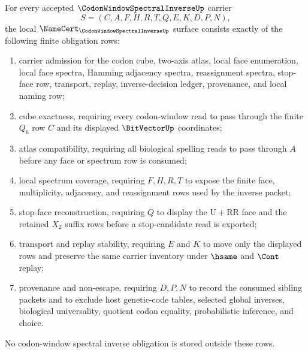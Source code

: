 
\begin{theorem}
\label{thm:codon-window-spectral-inverse-namecert-obligations}
For every accepted $\CodonWindowSpectralInverseUp$ carrier
$$
S=(C,A,F,H,R,T,Q,E,K,D,P,N),
$$
the local $\NameCert_{\CodonWindowSpectralInverseUp}$ surface consists exactly of the following finite obligation rows:
\begin{enumerate}
\item carrier admission for the codon cube, two-axis atlas, local face enumeration, local face spectra, Hamming adjacency spectra, reassignment spectra, stop-face row, transport, replay, inverse-decision ledger, provenance, and local naming row;
\item cube exactness, requiring every codon-window read to pass through the finite $Q_{6}$ row $C$ and its displayed $\BitVectorUp$ coordinates;
\item atlas compatibility, requiring all biological spelling reads to pass through $A$ before any face or spectrum row is consumed;
\item local spectrum coverage, requiring $F,H,R,T$ to expose the finite face, multiplicity, adjacency, and reassignment rows used by the inverse packet;
\item stop-face reconstruction, requiring $Q$ to display the $\mathrm{U}+\mathrm{RR}$ face and the retained $X_{2}$ suffix rows before a stop-candidate read is exported;
\item transport and replay stability, requiring $E$ and $K$ to move only the displayed rows and preserve the same carrier inventory under $\hsame$ and $\Cont$ replay;
\item provenance and non-escape, requiring $D,P,N$ to record the consumed sibling packets and to exclude host genetic-code tables, selected global inverses, biological universality, quotient codon equality, probabilistic inference, and choice.
\end{enumerate}
No codon-window spectral inverse obligation is stored outside these rows.
\end{theorem}
